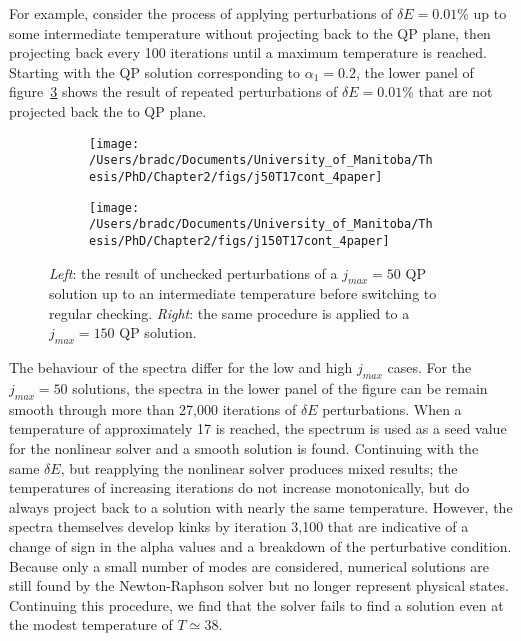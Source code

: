 \documentclass[../PhD.tex]{subfiles}
\begin{document}
\begin{subappendices}
For example, consider the process of applying perturbations of $\delta E = 0.01\%$ up to some intermediate temperature without projecting back to the QP plane, then projecting back every 100 iterations until a maximum temperature is reached. Starting with the QP solution corresponding to $\alpha_1 = 0.2$, the lower panel of figure~\ref{fig: reop check} shows the result of repeated perturbations of $\delta E = 0.01\%$ that are not projected back the to QP plane.

\begin{figure}[h]
	\centering
	\begin{subfigure}[t]{0.48\textwidth}
		\texttt{[image: /Users/bradc/Documents/University\_of\_Manitoba/Thesis/PhD/Chapter2/figs/j50T17cont\_4paper]}
		\label{fig: reop check j50}
	\end{subfigure}
	\;
	\begin{subfigure}[t]{0.48\textwidth}
		\texttt{[image: /Users/bradc/Documents/University\_of\_Manitoba/Thesis/PhD/Chapter2/figs/j150T17cont\_4paper]}
		\label{fig: reop check j150}
	\end{subfigure}
\caption[Comparison of spectra and temperatures for different projection frequencies between $j_{max}=50$ and $j_{max} = 150$ solutions]{{\it Left}: the result of unchecked perturbations of a $j_{max} = 50$ QP solution up to an intermediate temperature before switching to regular checking. {\it Right}: the same procedure is applied to a $j_{max}=150$ QP solution.}
\label{fig: reop check}
\end{figure}

The behaviour of the spectra differ for the low and high $j_{max}$ cases. For the $j_{max}=50$ solutions, the spectra in the lower panel of the figure can be remain smooth through more than 27,000 iterations of $\delta E$ perturbations. When a temperature of approximately 17 is reached, the spectrum is used as a seed value for the nonlinear solver and a smooth solution is found. Continuing with the same $\delta E$, but reapplying the nonlinear solver produces mixed results; the temperatures of increasing iterations do not increase monotonically, but do always project back to a solution with nearly the same temperature. However, the spectra themselves develop kinks by iteration 3,100 that are indicative of a change of sign in the alpha values and a breakdown of the perturbative condition. Because only a small number of modes are considered, numerical solutions are still found by the Newton-Raphson solver but no longer represent physical states. Continuing this procedure, we find that the solver fails to find a solution even at the modest temperature of $T \simeq 38$.


\end{subappendices}
\end{document}
